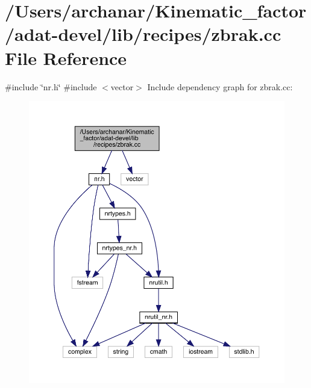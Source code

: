 \hypertarget{adat-devel_2lib_2recipes_2zbrak_8cc}{}\section{/\+Users/archanar/\+Kinematic\+\_\+factor/adat-\/devel/lib/recipes/zbrak.cc File Reference}
\label{adat-devel_2lib_2recipes_2zbrak_8cc}
{\ttfamily \#include \char`\"{}nr.\+h\char`\"{}}\newline
{\ttfamily \#include $<$vector$>$}\newline
Include dependency graph for zbrak.\+cc\+:
\nopagebreak
\begin{figure}[H]
\begin{center}
\leavevmode
\includegraphics[width=350pt]{dd/d91/adat-devel_2lib_2recipes_2zbrak_8cc__incl}
\end{center}
\end{figure}
